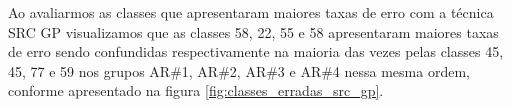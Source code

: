 %
%
%
%


%

Ao avaliarmos as classes que apresentaram maiores taxas de erro com a técnica SRC GP visualizamos que as classes 58, 22, 55 e 58 apresentaram maiores taxas de erro sendo confundidas respectivamente na maioria das vezes pelas classes 45, 45, 77 e 59 nos grupos AR\#1, AR\#2, AR\#3 e AR\#4 nessa mesma ordem, conforme apresentado na figura \ref{fig:classes_erradas_src_gp}.

